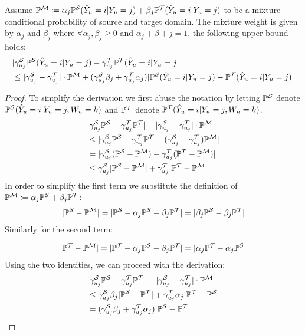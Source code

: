 \begin{lemma}
\label{error decomposition lemma}
    Assume $\probm \coloneq 
    \alpha_j 
    \probs(\predy_u=i| \rvY_u=j)
    + 
    \beta_j 
    \probt(\predy_u=i| \rvY_u=j)$ to be a mixture conditional probability of source and target domain. The mixture weight is given by $\alpha_j$ and $\beta_j$ where $\forall \alpha_j,\beta_j \geq 0$ and $\alpha_j+\beta+j=1$, the following upper bound holds:
    \begin{align*}
    &\abs{\gammas{u_j}\probs(\predy_u=i| \rvY_u=j) - \gammat{u_j}\probt(\predy_u=i| \rvY_u=j} \\
    &\leq\abs{\gammas{u_j} - \gammat{u_j}} \cdot 
    \probm
    + (\gammas{u_j}\beta_j+\gammat{u_j}\alpha_j)\abs{ \probs(\predy_u=i| \rvY_u=j) -  \probt(\predy_u=i| \rvY_u=j)}
    \end{align*}


\begin{proof}
    To simplify the derivation we first abuse the notation by letting $\probs$ denote $\probs(\predy_u=i| \rvY_u=j, \rvW_u=k)$ and $\probt$ denote $\probt(\predy_u=i| \rvY_u=j, \rvW_u=k)$.
    \begin{align*}
    &\abs{\gammas{u_j}\probs - \gammat{u_j}\probt} 
    - \abs{\gammas{u_j}- \gammat{u_j}} \cdot \probm \\
    &\leq \abs{\gammas{u_j}\probs - \gammat{u_j}\probt - 
    \rpar{\gammas{u_j} - \gammat{u_j}}\probm}\\
    &=\abs{\gammas{u_j}\rpar{\probs-\probm} - \gammat{u_j}\rpar{\probt-\probm}} \\
    &\leq \gammas{u_j}\abs{\probs-\probm} + \gammat{u_j} \abs{\probt-\probm}
    \end{align*}
    In order to simplify the first term we substitute the definition of $\probm \coloneq \alpha_j \probs
    + \beta_j \probt$:
    \begin{align*}
        \abs{\probs-\probm} = \abs{\probs - \alpha_j \probs -\beta_j\probt} 
        =  \abs{ \beta_j\probs -\beta_j \probt}
    \end{align*}
    Similarly for the second term:

    \begin{align*}
        \abs{\probt-\probm} = \abs{\probt - \alpha_j \probs -\beta_j \probt} = \abs{\alpha_j \probt -\alpha_j \probs}
    \end{align*}
    Using the two identities, we can proceed with the derivation:
    \begin{align*}
         &\abs{\gammas{u_j}\probs - \gammat{u_j}\probt} - \abs{\gammas{u_j}
         - \gammat{u_j}} \cdot \probm \\
    &\leq \gammas{u_j}\beta_j\abs{ \probs - \probt} + \gammat{u_j}\alpha_j\abs{\probt-\probs} \\
    &= (\gammas{u_j}\beta_j+\gammat{u_j}\alpha_j)\abs{ \probs - \probt}
    \end{align*}
\end{proof}
\end{lemma}

